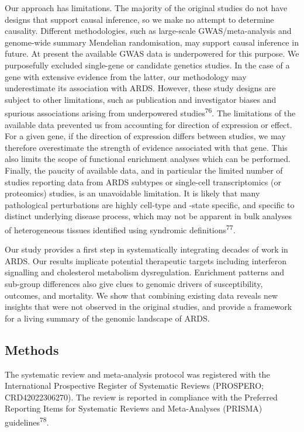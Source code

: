 \documentclass[
  11,
  a4paper,
]{article}
\begin{document}
Our approach has limitations. The majority of the original studies do
not have designs that support causal inference, so we make no attempt to
determine causality. Different methodologies, such as large-scale
GWAS/meta-analysis and genome-wide summary Mendelian randomisation, may
support causal inference in future. At present the available GWAS data
is underpowered for this purpose. We purposefully excluded single-gene
or candidate genetics studies. In the case of a gene with extensive
evidence from the latter, our methodology may underestimate its
association with ARDS. However, these study designs are subject to other
limitations, such as publication and investigator biases and spurious
associations arising from underpowered studies\textsuperscript{76}. The
limitations of the available data prevented us from accounting for
direction of expression or effect. For a given gene, if the direction of
expression differs between studies, we may therefore overestimate the
strength of evidence associated with that gene. This also limits the
scope of functional enrichment analyses which can be performed. Finally,
the paucity of available data, and in particular the limited number of
studies reporting data from ARDS subtypes or single-cell transcriptomics
(or proteomics) studies, is an unavoidable limitation. It is likely that
many pathological perturbations are highly cell-type and -state
specific, and specific to distinct underlying disease process, which may
not be apparent in bulk analyses of heterogeneous tissues identified
using syndromic definitions\textsuperscript{77}.

Our study provides a first step in systematically integrating decades of
work in ARDS. Our results implicate potential therapeutic targets
including interferon signalling and cholesterol metabolism
dysregulation. Enrichment patterns and sub-group differences also give
clues to genomic drivers of susceptibility, outcomes, and mortality. We
show that combining existing data reveals new insights that were not
observed in the original studies, and provide a framework for a living
summary of the genomic landscape of ARDS.

\newpage

\subsection{Methods}\label{methods}

The systematic review and meta-analysis protocol was registered with the
International Prospective Register of Systematic Reviews (PROSPERO;
CRD42022306270). The review is reported in compliance with the Preferred
Reporting Items for Systematic Reviews and Meta-Analyses (PRISMA)
guidelines\textsuperscript{78}.
\end{document}
